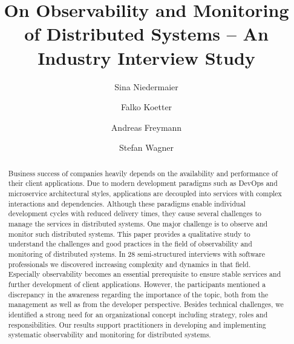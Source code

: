 \documentclass[runningheads]{llncs}
\begin{document}
%
\title{On Observability and Monitoring of Distributed Systems -- An Industry Interview Study }
%
%
\author{Sina Niedermaier \and
Falko Koetter \and
Andreas Freymann \and Stefan Wagner}
%
%
%
\maketitle              %
%
\begin{abstract}
Business success of companies heavily depends on the availability and performance of their client applications. Due to modern development paradigms such as DevOps and microservice architectural styles, applications are decoupled into services with complex interactions and dependencies. Although these paradigms enable individual development cycles with reduced delivery times, they cause several challenges to manage the services in distributed systems. One major challenge is to observe and monitor such distributed systems.
This paper provides a qualitative study to understand the challenges and good practices in the field of observability and monitoring of distributed systems.
In 28 semi-structured interviews with software professionals we discovered increasing complexity and dynamics in that field. Especially observability becomes an essential prerequisite to ensure stable services and further development of client applications. However, the participants mentioned a discrepancy in the awareness regarding the importance of the topic, both from the management as well as from the developer perspective.
Besides technical challenges, we identified a strong need for an organizational concept including strategy, roles and responsibilities. Our results support practitioners in developing and implementing systematic observability and monitoring for distributed systems. 


\end{abstract}
%
%
%
\end{document}
